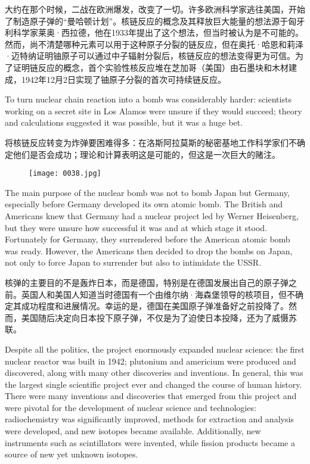 \documentclass[dvipsnames, svgnames,a4paper,11pt]{article}
\begin{document}
大约在那个时候，二战在欧洲爆发，改变了一切。许多欧洲科学家逃往美国，开始了制造原子弹的“曼哈顿计划”。核链反应的概念及其释放巨大能量的想法源于匈牙利科学家莱奥·西拉德，他在1933年提出了这个想法，但当时被认为是不可能的。然而，尚不清楚哪种元素可以用于这种原子分裂的链反应，但在奥托·哈恩和莉泽·迈特纳证明铀原子可以通过中子辐射分裂后，核链反应的想法变得更为可信。为了证明链反应的概念，首个实验性核反应堆在芝加哥（美国）由石墨块和木材建成，1942年12月2日实现了铀原子分裂的首次可持续链反应。

To turn nuclear chain reaction into a bomb was considerably harder: scientists working on a secret site in Los Alamos were unsure if they would succeed; theory and calculations suggested it was possible, but it was a huge bet.

将核链反应转变为炸弹要困难得多：在洛斯阿拉莫斯的秘密基地工作科学家们不确定他们是否会成功；理论和计算表明这是可能的，但这是一次巨大的赌注。

\begin{figure}[h]
      \centering
      \texttt{[image: 0038.jpg]}
       \label{fig29}
\end{figure}

The main purpose of the nuclear bomb was not to bomb Japan but Germany, especially before Germany developed its own atomic bomb. The British and Americans knew that Germany had a nuclear project led by Werner Heisenberg, but they were unsure how successful it was and at which stage it stood. Fortunately for Germany, they surrendered before the American atomic bomb was ready. However, the Americans then decided to drop the bombs on Japan, not only to force Japan to surrender but also to intimidate the USSR.

核弹的主要目的不是轰炸日本，而是德国，特别是在德国发展出自己的原子弹之前。英国人和美国人知道当时德国有一个由维尔纳·海森堡领导的核项目，但不确定其成功程度和进展情况。幸运的是，德国在美国原子弹准备好之前投降了。然而，美国随后决定向日本投下原子弹，不仅是为了迫使日本投降，还为了威慑苏联。

Despite all the politics, the project enormously expanded nuclear science: the first nuclear reactor was built in 1942; plutonium and americium were produced and discovered, along with many other discoveries and inventions. In general, this was the largest single scientific project ever and changed the course of human history. There were many inventions and discoveries that emerged from this project and were pivotal for the development of nuclear science and technologies: radiochemistry was significantly improved, methods for extraction and analysis were developed, and new isotopes became available. Additionally, new instruments such as scintillators were invented, while fission products became a source of new yet unknown isotopes.
\end{document}
